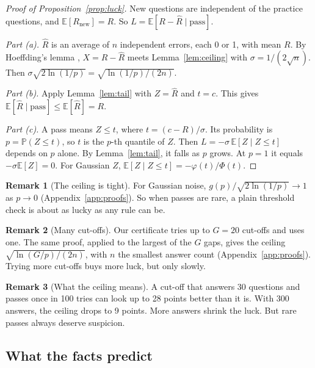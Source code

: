 \documentclass[11pt]{article}
\theoremstyle{plain}
\theoremstyle{definition}
\newtheorem{remark}{Remark}
\renewcommand{\Pr}{\mathbb{P}}
\newcommand{\E}{\mathbb{E}}
\newcommand{\Rnew}{R_{\mathrm{new}}}
\begin{document}
\begin{proof}[Proof of Proposition~\ref{prop:luck}]
New questions are independent of the practice questions, and $\E[\Rnew] = R$. So $L = \E[R - \hat R \mid \text{pass}]$.

\emph{Part (a).} $\hat R$ is an average of $n$ independent errors, each 0 or 1, with mean $R$. By Hoeffding's lemma \citep{hoeffding1963probability}, $X = R - \hat R$ meets Lemma~\ref{lem:ceiling} with $\sigma = 1/(2\sqrt n)$. Then $\sigma\sqrt{2\ln(1/p)} = \sqrt{\ln(1/p)/(2n)}$.

\emph{Part (b).} Apply Lemma~\ref{lem:tail} with $Z = \hat R$ and $t = c$. This gives $\E[\hat R \mid \text{pass}] \le \E[\hat R] = R$.

\emph{Part (c).} A pass means $Z \le t$, where $t = (c - R)/\sigma$. Its probability is $p = \Pr(Z \le t)$, so $t$ is the $p$-th quantile of $Z$. Then $L = -\sigma\,\E[Z \mid Z \le t]$ depends on $p$ alone. By Lemma~\ref{lem:tail}, it falls as $p$ grows. At $p = 1$ it equals $-\sigma\E[Z] = 0$. For Gaussian $Z$, $\E[Z \mid Z \le t] = -\varphi(t)/\Phi(t)$.
\end{proof}

\begin{remark}[The ceiling is tight]
For Gaussian noise, $g(p)/\sqrt{2\ln(1/p)} \to 1$ as $p \to 0$ (Appendix~\ref{app:proofs}). So when passes are rare, a plain threshold check is about as lucky as any rule can be.
\end{remark}

\begin{remark}[Many cut-offs]
\label{rem:many}
Our certificate tries up to $G = 20$ cut-offs and uses one. The same proof, applied to the largest of the $G$ gaps, gives the ceiling $\sqrt{\ln(G/p)/(2n)}$, with $n$ the smallest answer count (Appendix~\ref{app:proofs}). Trying more cut-offs buys more luck, but only slowly.
\end{remark}

\begin{remark}[What the ceiling means]
A cut-off that answers 30 questions and passes once in 100 tries can look up to 28 points better than it is. With 300 answers, the ceiling drops to 9 points. More answers shrink the luck. But rare passes always deserve suspicion.
\end{remark}

\subsection{What the facts predict}
\label{sec:predictions}
\end{document}

